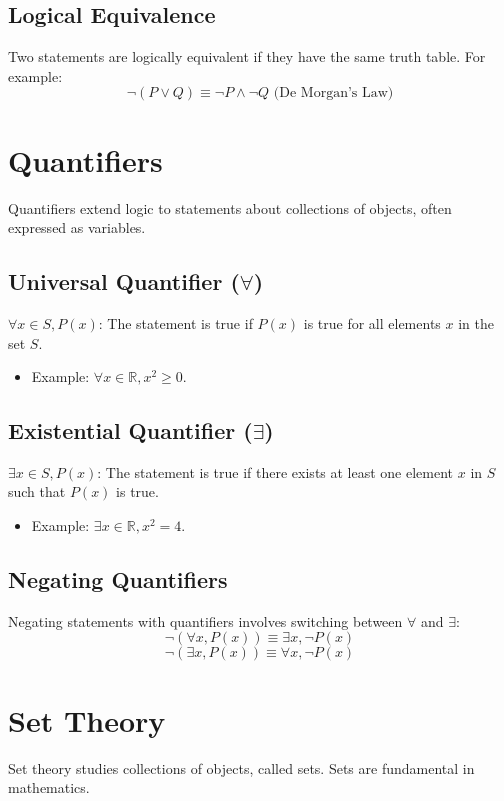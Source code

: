 \documentclass[a4paper,12pt]{article}
\begin{document}
\subsection{Logical Equivalence}
Two statements are logically equivalent if they have the same truth table. For example:
\[\neg(P \lor Q) \equiv \neg P \land \neg Q \text{ (De Morgan's Law)}\]

\section{Quantifiers}
Quantifiers extend logic to statements about collections of objects, often expressed as variables.

\subsection{Universal Quantifier (\(\forall\))}
\(\forall x \in S, P(x)\): The statement is true if \(P(x)\) is true for all elements \(x\) in the set \(S\).
\begin{itemize}
    \item Example: \(\forall x \in \mathbb{R}, x^2 \geq 0\).
\end{itemize}

\subsection{Existential Quantifier (\(\exists\))}
\(\exists x \in S, P(x)\): The statement is true if there exists at least one element \(x\) in \(S\) such that \(P(x)\) is true.
\begin{itemize}
    \item Example: \(\exists x \in \mathbb{R}, x^2 = 4\).
\end{itemize}

\subsection{Negating Quantifiers}
Negating statements with quantifiers involves switching between \(\forall\) and \(\exists\):
\[\neg(\forall x, P(x)) \equiv \exists x, \neg P(x)\]
\[\neg(\exists x, P(x)) \equiv \forall x, \neg P(x)\]

\section{Set Theory}
Set theory studies collections of objects, called sets. Sets are fundamental in mathematics.
\end{document}

